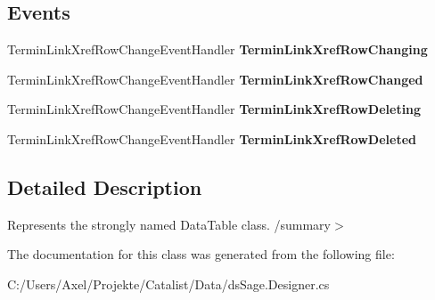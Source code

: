 \subsection*{Events}
\begin{DoxyCompactItemize}
\item 
Termin\+Link\+Xref\+Row\+Change\+Event\+Handler {\bfseries Termin\+Link\+Xref\+Row\+Changing}\hypertarget{class_products_1_1_data_1_1ds_sage_1_1_termin_link_xref_data_table_a98a2cf021e89d7ad7e0af94b2b3d8792}{}\label{class_products_1_1_data_1_1ds_sage_1_1_termin_link_xref_data_table_a98a2cf021e89d7ad7e0af94b2b3d8792}

\item 
Termin\+Link\+Xref\+Row\+Change\+Event\+Handler {\bfseries Termin\+Link\+Xref\+Row\+Changed}\hypertarget{class_products_1_1_data_1_1ds_sage_1_1_termin_link_xref_data_table_a6e2dffac342038cb4b0057d92b4170c8}{}\label{class_products_1_1_data_1_1ds_sage_1_1_termin_link_xref_data_table_a6e2dffac342038cb4b0057d92b4170c8}

\item 
Termin\+Link\+Xref\+Row\+Change\+Event\+Handler {\bfseries Termin\+Link\+Xref\+Row\+Deleting}\hypertarget{class_products_1_1_data_1_1ds_sage_1_1_termin_link_xref_data_table_a27bba2cef6e7a5e9807b51e4c639cbe5}{}\label{class_products_1_1_data_1_1ds_sage_1_1_termin_link_xref_data_table_a27bba2cef6e7a5e9807b51e4c639cbe5}

\item 
Termin\+Link\+Xref\+Row\+Change\+Event\+Handler {\bfseries Termin\+Link\+Xref\+Row\+Deleted}\hypertarget{class_products_1_1_data_1_1ds_sage_1_1_termin_link_xref_data_table_ac61568685e0c26c99c9103ba11758c86}{}\label{class_products_1_1_data_1_1ds_sage_1_1_termin_link_xref_data_table_ac61568685e0c26c99c9103ba11758c86}

\end{DoxyCompactItemize}


\subsection{Detailed Description}
Represents the strongly named Data\+Table class. /summary$>$ 

The documentation for this class was generated from the following file\+:\begin{DoxyCompactItemize}
\item 
C\+:/\+Users/\+Axel/\+Projekte/\+Catalist/\+Data/ds\+Sage.\+Designer.\+cs\end{DoxyCompactItemize}

